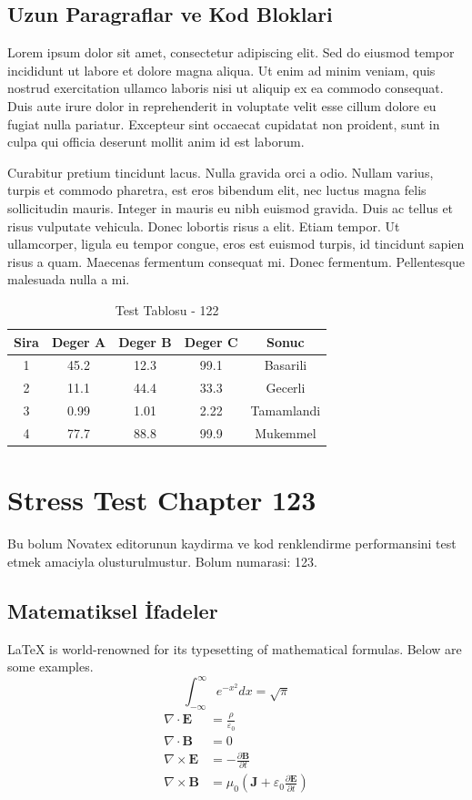 \documentclass[12pt,a4paper]{article}
\begin{document}
\subsection{Uzun Paragraflar ve Kod Bloklari}
Lorem ipsum dolor sit amet, consectetur adipiscing elit. Sed do eiusmod tempor incididunt ut labore et dolore magna aliqua. Ut enim ad minim veniam, quis nostrud exercitation ullamco laboris nisi ut aliquip ex ea commodo consequat. Duis aute irure dolor in reprehenderit in voluptate velit esse cillum dolore eu fugiat nulla pariatur. Excepteur sint occaecat cupidatat non proident, sunt in culpa qui officia deserunt mollit anim id est laborum.

Curabitur pretium tincidunt lacus. Nulla gravida orci a odio. Nullam varius, turpis et commodo pharetra, est eros bibendum elit, nec luctus magna felis sollicitudin mauris. Integer in mauris eu nibh euismod gravida. Duis ac tellus et risus vulputate vehicula. Donec lobortis risus a elit. Etiam tempor. Ut ullamcorper, ligula eu tempor congue, eros est euismod turpis, id tincidunt sapien risus a quam. Maecenas fermentum consequat mi. Donec fermentum. Pellentesque malesuada nulla a mi.

\begin{table}[h!]
\centering
\begin{tabular}{|c|c|c|c|c|}
\hline
\textbf{Sira} & \textbf{Deger A} & \textbf{Deger B} & \textbf{Deger C} & \textbf{Sonuc} \\
\hline
1 & 45.2 & 12.3 & 99.1 & Basarili \\
2 & 11.1 & 44.4 & 33.3 & Gecerli \\
3 & 0.99 & 1.01 & 2.22 & Tamamlandi \\
4 & 77.7 & 88.8 & 99.9 & Mukemmel \\
\hline
\end{tabular}
\caption{Test Tablosu - 122}
\end{table}

\newpage
\section{Stress Test Chapter 123}
Bu bolum Novatex editorunun kaydirma ve kod renklendirme performansini test etmek amaciyla olusturulmustur. Bolum numarasi: 123.

\subsection{Matematiksel İfadeler}
\LaTeX{} is world-renowned for its typesetting of mathematical formulas. Below are some examples.
\begin{equation}
\int_{-\infty}^{\infty} e^{-x^2} dx = \sqrt{\pi}
\end{equation}
\begin{align}
\nabla \cdot \mathbf{E} &= \frac{\rho}{\varepsilon_0} \\
\nabla \cdot \mathbf{B} &= 0 \\
\nabla \times \mathbf{E} &= -\frac{\partial \mathbf{B}}{\partial t} \\
\nabla \times \mathbf{B} &= \mu_0\left(\mathbf{J} + \varepsilon_0 \frac{\partial \mathbf{E}}{\partial t}\right)
\end{align}
\end{document}
